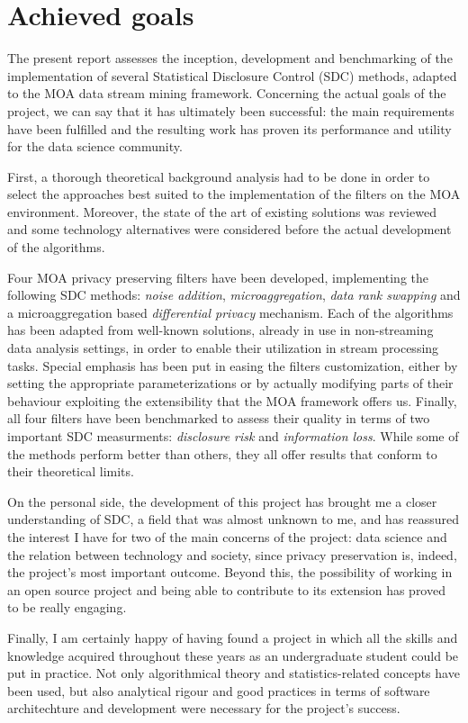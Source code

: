 \section{Achieved goals}
\label{Conclusions:Achieved}

The present report assesses the inception, development and benchmarking of the implementation of several Statistical Disclosure Control (SDC) methods, adapted to the MOA data stream mining framework. Concerning the actual goals of the project, we can say that it has ultimately been successful: the main requirements have been fulfilled and the resulting work has proven its performance and utility for the data science community.

First, a thorough theoretical background analysis had to be done in order to select the approaches best suited to the implementation of the filters on the MOA environment. Moreover, the state of the art of existing solutions was reviewed and some technology alternatives were considered before the actual development of the algorithms.

Four MOA privacy preserving filters have been developed, implementing the following SDC methods: \textit{noise addition}, \textit{microaggregation}, \textit{data rank swapping} and a microaggregation based \textit{differential privacy} mechanism. Each of the algorithms has been adapted from well-known solutions, already in use in non-streaming data analysis settings, in order to enable their utilization in stream processing tasks. Special emphasis has been put in easing the filters customization, either by setting the appropriate parameterizations or by actually modifying parts of their behaviour exploiting the extensibility that the MOA framework offers us. Finally, all four filters have been benchmarked to assess their quality in terms of two important SDC measurments: \textit{disclosure risk} and \textit{information loss}. While some of the methods perform better than others, they all offer results that conform to their theoretical limits.

On the personal side, the development of this project has brought me a closer understanding of SDC, a field that was almost unknown to me, and has reassured the interest I have for two of the main concerns of the project: data science and the relation between technology and society, since privacy preservation is, indeed, the project's most important outcome. Beyond this, the possibility of working in an open source project and being able to contribute to its extension has proved to be really engaging.

Finally, I am certainly happy of having found a project in which all the skills and knowledge acquired throughout these years as an undergraduate student could be put in practice. Not only algorithmical theory and statistics-related concepts have been used, but also analytical rigour and good practices in terms of software architechture and development were necessary for the project's success.